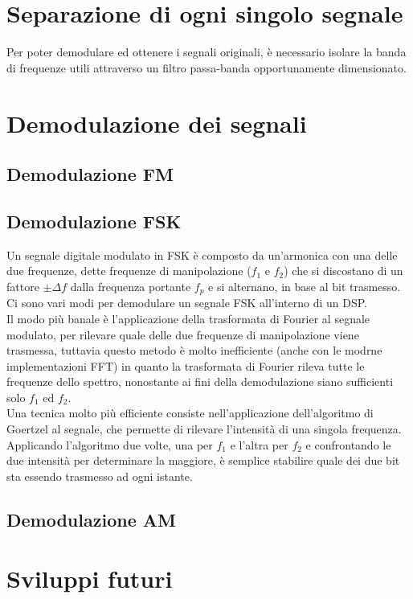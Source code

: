 \documentclass{article}
\begin{document}
\section{Separazione di ogni singolo segnale}
Per poter demodulare ed ottenere i segnali originali, è necessario isolare la banda di frequenze utili attraverso un filtro
passa-banda opportunamente dimensionato.

\section{Demodulazione dei segnali}

\subsection{Demodulazione FM}
\subsection{Demodulazione FSK}
Un segnale digitale modulato in FSK è composto da un'armonica con una delle due frequenze, dette frequenze di manipolazione
($f_1$ e $f_2$) che si discostano di un fattore $\pm \Delta f$ dalla frequenza portante $f_p$ e si alternano, in base al bit
trasmesso. Ci sono vari modi per demodulare un segnale FSK all'interno di un DSP.\\
Il modo più banale è l'applicazione della trasformata di Fourier al segnale modulato, per rilevare quale delle due frequenze
di manipolazione viene trasmessa, tuttavia questo metodo è molto inefficiente (anche con le modrne implementazioni FFT) in quanto
la trasformata di Fourier rileva tutte le frequenze dello spettro, nonostante ai fini della demodulazione siano sufficienti
solo $f_1$ ed $f_2$.\\
Una tecnica molto più efficiente consiste nell'applicazione dell'algoritmo di Goertzel al segnale, che permette di rilevare
l'intensità di una singola frequenza. Applicando l'algoritmo due volte, una per $f_1$ e l'altra per $f_2$ e confrontando le due
intensità per determinare la maggiore, è semplice stabilire quale dei due bit sta essendo trasmesso ad ogni istante.

\subsection{Demodulazione AM}




\section{Sviluppi futuri}
\end{document}
